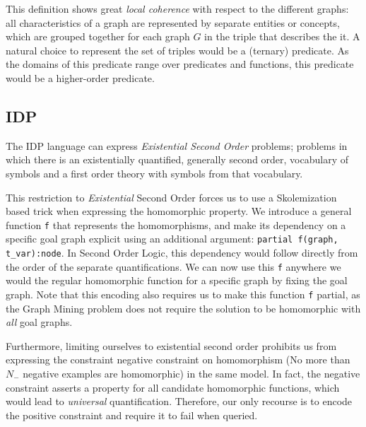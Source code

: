\documentclass{article}
\theoremstyle{definition}
\begin{document}
This definition shows great \emph{local coherence} with respect to the different graphs: all characteristics of a graph are represented by separate entities or concepts, which are grouped together for each graph $G$ in the triple that describes the it.
A natural choice to represent the set of triples would be a (ternary) predicate.
As the domains of this predicate range over predicates and functions, this predicate would be a higher-order predicate.


\subsection{IDP}
The IDP language can express \emph{Existential Second Order} problems; problems in which there is an existentially quantified, generally second order, vocabulary of symbols and a first order theory with symbols from that vocabulary.

This restriction to \emph{Existential} Second Order forces us 
to use a Skolemization based trick when expressing the homomorphic property.
We introduce a general function \verb|f| that represents the homomorphisms, and make its dependency on a specific goal graph explicit using an additional argument:
\verb|partial f(graph, t_var):node|.
In Second Order Logic, this dependency would follow directly from the order of the separate quantifications.
We can now use this \verb|f| anywhere we would the regular homomorphic function for a specific graph by fixing the goal graph.
Note that this encoding also requires us to make this function \verb|f| partial, as the Graph Mining problem does not require the solution to be homomorphic with \emph{all} goal graphs.

Furthermore, limiting ourselves to existential second order prohibits us from expressing the constraint negative constraint on homomorphism (No more than $N_{-}$ negative examples are homomorphic) in the same model.
In fact, the negative constraint asserts a property for all candidate homomorphic functions, which would lead to \emph{universal} quantification.
Therefore, our only recourse is to encode the positive constraint and require it to fail when queried.
\end{document}
